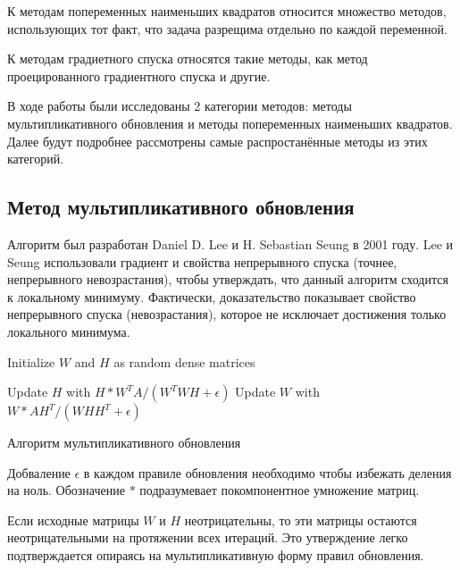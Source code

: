 К методам попеременных наименьших квадратов относится множество методов,
использующих тот факт, что задача разрещима отдельно по каждой переменной.

К методам градиетного спуска относятся такие методы, как метод проецированного градиентного спуска \cite{lin} и другие.

В ходе работы были исследованы 2 категории методов: методы мультипликативного обновления и методы попеременных наименьших квадратов.
Далее будут подробнее рассмотрены самые распростанённые методы из этих категорий.



\newpage



\subsection{Метод мультипликативного обновления}

Алгоритм был разработан Daniel D. Lee и H. Sebastian Seung в 2001 году.
Lee и Seung использовали градиент и свойства непрерывного спуска (точнее, непрерывного невозрастания),
чтобы утверждать, что данный алгоритм сходится к локальному минимуму.
Фактически, доказательство показывает свойство непрерывного спуска (невозрастания),
которое не исключает достижения только локального минимума.

\begin{algorithm} \label{alg:mu}

  \BlankLine
  \BlankLine


  \BlankLine

  Initialize $W$ and $H$ as random dense matrices\;

   {
    Update $H$ with $H * W^T A / (W^T W H + \epsilon)$\;
    Update $W$ with $W * A H^T / (W H H^T + \epsilon)$\;
  }

  \BlankLine

  \caption{Алгоритм мультипликативного обновления}
\end{algorithm}

Добваление $\epsilon$ в каждом правиле обновления необходимо чтобы избежать деления на ноль.
Обозначение $*$ подразумевает покомпонентное умножение матриц.

Если исходные матрицы $W$ и $H$ неотрицательны, то эти матрицы остаются неотрицательными на протяжении всех итераций.
Это утверждение легко подтверждается опираясь на мультипликативную форму правил обновления.

